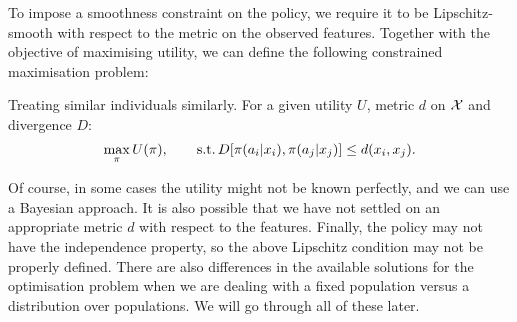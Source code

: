 {  To impose a smoothness constraint on the policy, we require it to be Lipschitz-smooth with respect to the metric on the observed features. Together with the objective of maximising utility, we can define the following constrained maximisation problem:
  \begin{block}{Treating similar individuals similarly.}
    For a given utility $U$, metric $d$ on ${\mathcal{X}}$ and divergence $D$:
    \begin{equation}
      \max_\pi  U(\pi), \qquad
      \mathop{\rm s.t.}  D[\pi(a_i | x_i), \pi(a_j | x_j)] \leq d(x_i,x_j). 
      \label{eq:lipschitz-fairness}
    \end{equation}
  \end{block}
  Of course, in some cases the utility might not be known perfectly, and we can use a Bayesian approach. It is also possible that we have not settled on an appropriate metric $d$ with respect to the features. Finally, the policy may not have the independence property, so the above Lipschitz condition may not be properly defined. There are also differences in the available solutions for the optimisation problem when we are dealing with a fixed population versus a distribution over populations.  We will go through all of these later. 
}

